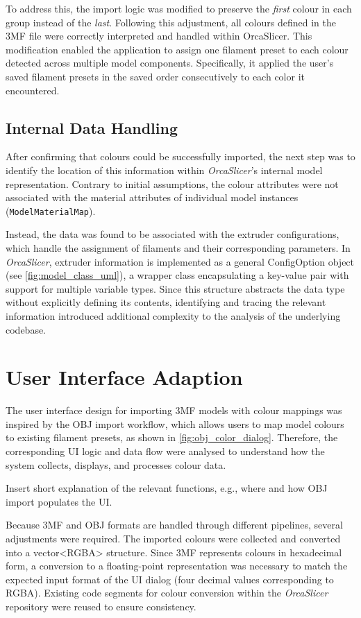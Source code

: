 To address this, the import logic was modified to preserve the \textit{first} colour in each group instead of the \textit{last}. 
Following this adjustment, all colours defined in the 3MF file were correctly interpreted and handled within OrcaSlicer. 
This modification enabled the application to assign one filament preset to each colour detected across multiple model components.
Specifically, it applied the user's saved filament presets in the saved order consecutively to each color it encountered. 

\subsection{Internal Data Handling}

After confirming that colours could be successfully imported, the next step was to identify the location of this information within \textit{OrcaSlicer}’s internal model representation. 
Contrary to initial assumptions, the colour attributes were not associated with the material attributes of individual model instances (\texttt{ModelMaterialMap}). 

Instead, the data was found to be associated with the extruder configurations, which handle the assignment of filaments and their corresponding parameters.
In \textit{OrcaSlicer}, extruder information is implemented as a general ConfigOption object (see \ref{fig:model_class_uml}), a wrapper class encapsulating a key-value pair with support for multiple variable types.
Since this structure abstracts the data type without explicitly defining its contents, identifying and tracing the relevant information introduced additional complexity to the analysis of the underlying codebase.

\section{User Interface Adaption}

The user interface design for importing 3MF models with colour mappings was inspired by the OBJ import workflow, which allows users to map model colours to existing filament presets, as shown in \ref{fig:obj_color_dialog}. 
Therefore, the corresponding UI logic and data flow were analysed to understand how the system collects, displays, and processes colour data.

{\todo Insert short explanation of the relevant functions, e.g., where and how OBJ import populates the UI.}


Because 3MF and OBJ formats are handled through different pipelines, several adjustments were required. 
The imported colours were collected and converted into a vector<RGBA> structure. 
Since 3MF represents colours in hexadecimal form, a conversion to a floating-point representation was necessary to match the expected input format of the UI dialog (four decimal values corresponding to RGBA). 
Existing code segments for colour conversion within the \textit{OrcaSlicer} repository were reused to ensure consistency.

